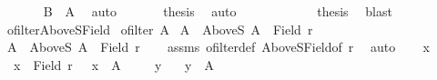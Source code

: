 \begin{isabellebody}
\ \ \ \ \ \isamarkupfalse%
\ {\isachardoublequoteopen}B\ {\isasymle}\ A{\isachardoublequoteclose}\ \isamarkupfalse%
\ auto\isanewline
\ \ \ \ \ \isamarkupfalse%
\ {\isacharquery}{\kern0pt}thesis\ \isamarkupfalse%
\ auto\isanewline
\ \ \ \ \isacommand{{\isacharbraceright}{\kern0pt}}\isamarkupfalse%
\isanewline
\ \ \ \ \isamarkupfalse%
\ \isamarkupfalse%
\ {\isacharquery}{\kern0pt}thesis\ \isamarkupfalse%
\ blast\isanewline
\ \ \isamarkupfalse%
\isanewline
{}\isamarkupfalse%
%
\endisatagproof
{\isafoldproof}%
%
\isadelimproof
\isanewline
%
\endisadelimproof
\isanewline
{}\isamarkupfalse%
\ ofilter{\isacharunderscore}{\kern0pt}AboveS{\isacharunderscore}{\kern0pt}Field{\isacharcolon}{\kern0pt}\isanewline
{}\ {\isachardoublequoteopen}ofilter\ A{\isachardoublequoteclose}\isanewline
{}\ {\isachardoublequoteopen}A\ {\isasymunion}\ {\isacharparenleft}{\kern0pt}AboveS\ A{\isacharparenright}{\kern0pt}\ {\isacharequal}{\kern0pt}\ Field\ r{\isachardoublequoteclose}\isanewline
%
\isadelimproof
%
\endisadelimproof
%
\isatagproof
{}\isamarkupfalse%
\isanewline
\ \ \isamarkupfalse%
\ {\isachardoublequoteopen}A\ {\isasymunion}\ {\isacharparenleft}{\kern0pt}AboveS\ A{\isacharparenright}{\kern0pt}\ {\isasymle}\ Field\ r{\isachardoublequoteclose}\isanewline
\ \ \isamarkupfalse%
\ assms\ ofilter{\isacharunderscore}{\kern0pt}def\ AboveS{\isacharunderscore}{\kern0pt}Field{\isacharbrackleft}{\kern0pt}of\ r{\isacharbrackright}{\kern0pt}\ \isamarkupfalse%
\ auto\isanewline
{}\isamarkupfalse%
\isanewline
\ \ \isacommand{{\isacharbraceleft}{\kern0pt}}\isamarkupfalse%
\isamarkupfalse%
\ x\ \isamarkupfalse%
\ {\isacharasterisk}{\kern0pt}{\isacharcolon}{\kern0pt}\ {\isachardoublequoteopen}x\ {\isasymin}\ Field\ r{\isachardoublequoteclose}\ \ {\isacharasterisk}{\kern0pt}{\isacharasterisk}{\kern0pt}{\isacharcolon}{\kern0pt}\ {\isachardoublequoteopen}x\ {\isasymnotin}\ A{\isachardoublequoteclose}\isanewline
\ \ \ \isacommand{{\isacharbraceleft}{\kern0pt}}\isamarkupfalse%
\isamarkupfalse%
\ y\ \isamarkupfalse%
\ {\isacharasterisk}{\kern0pt}{\isacharasterisk}{\kern0pt}{\isacharasterisk}{\kern0pt}{\isacharcolon}{\kern0pt}\ {\isachardoublequoteopen}y\ {\isasymin}\ A{\isachardoublequoteclose}\isanewline
\ \ \ \ \isamarkupfalse%

\end{isabellebody}
